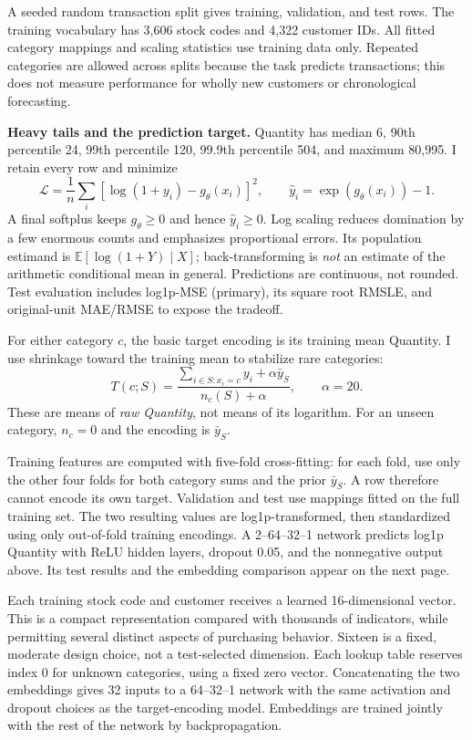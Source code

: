 \documentclass[10pt,letterpaper]{article}
\newcommand{\heading}[1]{\vspace{4pt}{\large\bfseries #1}\par}
\newcommand{\parthead}[1]{\vspace{3pt}{\bfseries #1}\par}
\begin{document}
A seeded random transaction split gives \RetailTrain{} training, \RetailValidation{} validation, and \RetailTest{} test rows. The training vocabulary has 3,606 stock codes and 4,322 customer IDs. All fitted category mappings and scaling statistics use training data only. Repeated categories are allowed across splits because the task predicts transactions; this does not measure performance for wholly new customers or chronological forecasting.

\textbf{Heavy tails and the prediction target.} Quantity has median 6, 90th percentile 24, 99th percentile 120, 99.9th percentile 504, and maximum 80,995. I retain every row and minimize
\[
 \mathcal L=\frac1n\sum_i[\log(1+y_i)-g_\theta(x_i)]^2,
 \qquad \widehat y_i=\exp(g_\theta(x_i))-1.
\]
A final softplus keeps $g_\theta\geq0$ and hence $\widehat y_i\geq0$. Log scaling reduces domination by a few enormous counts and emphasizes proportional errors. Its population estimand is $\mathbb E[\log(1+Y)\mid X]$; back-transforming is \emph{not} an estimate of the arithmetic conditional mean in general. Predictions are continuous, not rounded. Test evaluation includes log1p-MSE (primary), its square root RMSLE, and original-unit MAE/RMSE to expose the tradeoff.

\parthead{(b) Target encoding and leakage prevention}
For either category $c$, the basic target encoding is its training mean Quantity. I use shrinkage toward the training mean to stabilize rare categories:
\[
 T(c;S)=\frac{\sum_{i\in S:x_i=c}y_i+\alpha\bar y_S}{n_c(S)+\alpha},
 \qquad \alpha=20.
\]
These are means of \emph{raw Quantity}, not means of its logarithm. For an unseen category, $n_c=0$ and the encoding is $\bar y_S$.

Training features are computed with five-fold cross-fitting: for each fold, use only the other four folds for both category sums and the prior $\bar y_S$. A row therefore cannot encode its own target. Validation and test use mappings fitted on the full training set. The two resulting values are log1p-transformed, then standardized using only out-of-fold training encodings. A 2--64--32--1 network predicts log1p Quantity with ReLU hidden layers, dropout 0.05, and the nonnegative output above. Its test results and the embedding comparison appear on the next page.

\newpage
\heading{2(c)--(d). Embeddings and combined features}
\parthead{(c) Learned categorical embeddings}
Each training stock code and customer receives a learned 16-dimensional vector. This is a compact representation compared with thousands of indicators, while permitting several distinct aspects of purchasing behavior. Sixteen is a fixed, moderate design choice, not a test-selected dimension. Each lookup table reserves index 0 for unknown categories, using a fixed zero vector. Concatenating the two embeddings gives 32 inputs to a 64--32--1 network with the same activation and dropout choices as the target-encoding model. Embeddings are trained jointly with the rest of the network by backpropagation.
\end{document}
